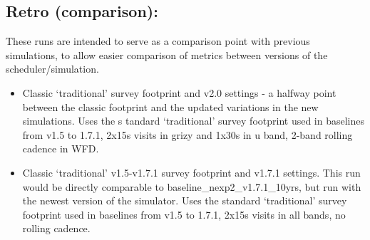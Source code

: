 \subsection{Retro (comparison):}
These runs are intended to serve as a comparison point with previous simulations, to allow easier comparison of metrics between versions of the scheduler/simulation.
\begin{itemize} 
\item Classic ‘traditional’ survey footprint and v2.0 settings - a halfway point between the classic footprint and the updated variations in the new simulations. Uses the s tandard ‘traditional’ survey footprint used in baselines from v1.5 to 1.7.1, 2x15s visits in grizy and 1x30s in u band, 2-band rolling cadence in WFD.
\item Classic ‘traditional’ v1.5-v1.7.1 survey footprint and v1.7.1 settings. This run would be directly comparable to baseline\_nexp2\_v1.7.1\_10yrs, but run with the newest version of the simulator. Uses the standard ‘traditional’ survey footprint used in baselines from v1.5 to 1.7.1, 2x15s visits in all bands, no rolling cadence.
\end{itemize}

